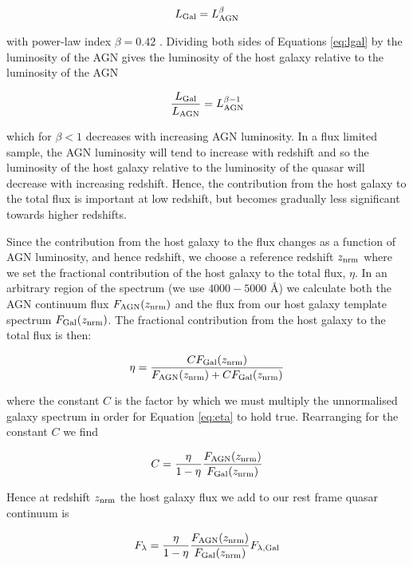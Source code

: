 \begin{eqnarray}
  \label{eq:lgal}
  L_{\rm Gal} = L_{\rm AGN}^{\beta} 
\end{eqnarray}

with power-law index $\beta=0.42$ \citep{maddox06}. Dividing both sides of Equations \ref{eq:lgal} by the luminosity of the AGN gives the luminosity of the host galaxy relative to the luminosity of the AGN

\begin{eqnarray}
  \frac{L_{\rm Gal}}{L_{\rm AGN}} = L_{\rm AGN}^{\beta - 1} 
\end{eqnarray}

which for $\beta < 1$ decreases with increasing AGN luminosity. In a flux limited sample, the AGN luminosity will tend to increase with redshift and so the luminosity of the host galaxy relative to the luminosity of the quasar will decrease with increasing redshift. Hence, the contribution from the host galaxy to the total flux is important at low redshift, but becomes gradually less significant towards higher redshifts. 

Since the contribution from the host galaxy to the flux changes as a function of AGN luminosity, and hence redshift, we choose a reference redshift $z_{\rm nrm}$ where we set the fractional contribution of the host galaxy to the total flux, $\eta$. In an arbitrary region of the spectrum (we use $4000 - 5000$ \AA) we calculate both the AGN continuum flux $F_{\rm AGN}(z_{\rm nrm})$ and the flux from our host galaxy template spectrum $F_{\rm Gal}(z_{\rm nrm})$. The fractional contribution from the host galaxy to the total flux is then:

\begin{eqnarray}
  \label{eq:eta}
  \eta = \frac{CF_{\rm Gal}(z_{\rm nrm})}{F_{\rm AGN}(z_{\rm nrm}) + CF_{\rm Gal}(z_{\rm nrm})}
\end{eqnarray}

where the constant $C$ is the factor by which we must multiply the unnormalised galaxy spectrum in order for Equation \ref{eq:eta} to hold true. Rearranging for the constant $C$ we find

\begin{eqnarray}
  C = \frac{\eta}{1 - \eta} \frac{F_{\rm AGN}(z_{\rm nrm})}{F_{\rm Gal}(z_{\rm nrm})}
\end{eqnarray}
 
Hence at redshift $z_{\rm nrm}$ the host galaxy flux we add to our rest frame quasar continuum is 

\begin{eqnarray}
  \label{eq:flambda}
  F_{\lambda} = \frac{\eta}{1 - \eta} \frac{F_{\rm AGN}(z_{\rm nrm})}{F_{\rm Gal}(z_{\rm nrm})} F_{\lambda,{\rm Gal}}
\end{eqnarray}

